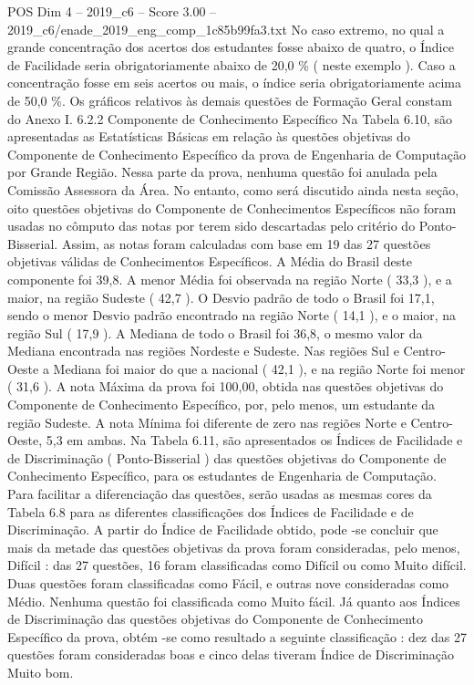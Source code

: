 \begin{textsample}{POS Dim 4 – 2019\_c6 – Score 3.00 – 2019\_c6/enade\_2019\_eng\_comp\_1c85b99fa3.txt}
No caso extremo, no qual a grande concentração dos acertos dos estudantes fosse abaixo de quatro, o Índice de Facilidade seria obrigatoriamente abaixo de 20,0 \% ( neste exemplo ).
Caso a concentração fosse em seis acertos ou mais, o índice seria obrigatoriamente acima de 50,0 \%.
Os gráficos relativos às demais questões de Formação Geral constam do Anexo I. 6.2.2 Componente de Conhecimento Específico Na Tabela 6.10, são apresentadas as Estatísticas Básicas em relação às questões objetivas do Componente de Conhecimento Específico da prova de Engenharia de Computação por Grande Região.
Nessa parte da prova, nenhuma questão foi anulada pela Comissão Assessora da Área.
No entanto, como será discutido ainda nesta seção, oito questões objetivas do Componente de Conhecimentos Específicos não foram usadas no cômputo das notas por terem sido descartadas pelo critério do Ponto-Bisserial.
Assim, as notas foram calculadas com base em 19 das 27 questões objetivas válidas de Conhecimentos Específicos.
A Média do Brasil deste componente foi 39,8.
A menor Média foi observada na região Norte ( 33,3 ), e a maior, na região Sudeste ( 42,7 ).
O Desvio padrão de todo o Brasil foi 17,1, sendo o menor Desvio padrão encontrado na região Norte ( 14,1 ), e o maior, na região Sul ( 17,9 ).
A Mediana de todo o Brasil foi 36,8, o mesmo valor da Mediana encontrada nas regiões Nordeste e Sudeste.
Nas regiões Sul e Centro-Oeste a Mediana foi maior do que a nacional ( 42,1 ), e na região Norte foi menor ( 31,6 ).
A nota Máxima da prova foi 100,00, obtida nas questões objetivas do Componente de Conhecimento Específico, por, pelo menos, um estudante da região Sudeste.
A nota Mínima foi diferente de zero nas regiões Norte e Centro-Oeste, 5,3 em ambas.
Na Tabela 6.11, são apresentados os Índices de Facilidade e de Discriminação ( Ponto-Bisserial ) das questões objetivas do Componente de Conhecimento Específico, para os estudantes de Engenharia de Computação.
Para facilitar a diferenciação das questões, serão usadas as mesmas cores da Tabela 6.8 para as diferentes classificações dos Índices de Facilidade e de Discriminação.
A partir do Índice de Facilidade obtido, pode -se concluir que mais da metade das questões objetivas da prova foram consideradas, pelo menos, Difícil : das 27 questões, 16 foram classificadas como Difícil ou como Muito difícil.
Duas questões foram classificadas como Fácil, e outras nove consideradas como Médio.
Nenhuma questão foi classificada como Muito fácil.
Já quanto aos Índices de Discriminação das questões objetivas do Componente de Conhecimento Específico da prova, obtém -se como resultado a seguinte classificação : dez das 27 questões foram consideradas boas e cinco delas tiveram Índice de Discriminação Muito bom.

\end{textsample}
